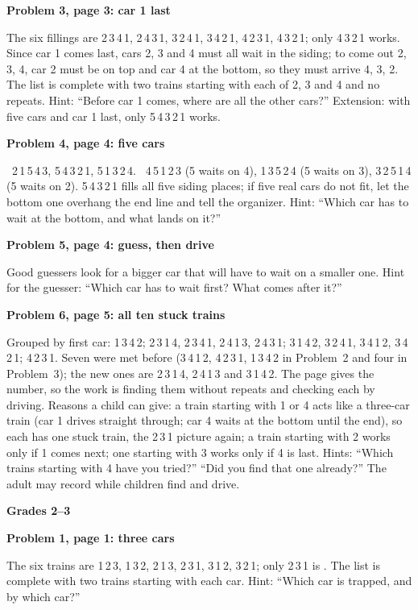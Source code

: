 \documentclass[11pt]{article}
\newcommand{\head}[1]{\par\needspace{5\baselineskip}\textbf{\large #1}\par\nopagebreak}
\newcommand{\sub}[1]{\par\needspace{3\baselineskip}\textbf{#1}\par\nopagebreak}
\newcommand{\yes}{\ding{51}}\newcommand{\no}{\ding{55}}
\newcommand{\tr}[1]{\mbox{#1}}
\begin{document}
\sub{Problem 3, page 3: car 1 last}
The six fillings are \tr{2\,3\,4\,1}, \tr{2\,4\,3\,1}, \tr{3\,2\,4\,1}, \tr{3\,4\,2\,1}, \tr{4\,2\,3\,1}, \tr{4\,3\,2\,1}; only \tr{4\,3\,2\,1} works. Since car 1 comes last, cars 2, 3 and 4 must all wait in the siding; to come out 2, 3, 4, car 2 must be on top and car 4 at the bottom, so they must arrive 4, 3, 2. The list is complete with two trains starting with each of 2, 3 and 4 and no repeats. Hint: ``Before car 1 comes, where are all the other cars?'' Extension: with five cars and car 1 last, only \tr{5\,4\,3\,2\,1} works.

\sub{Problem 4, page 4: five cars}
\yes~\tr{2\,1\,5\,4\,3}, \tr{5\,4\,3\,2\,1}, \tr{5\,1\,3\,2\,4}. \no~\tr{4\,5\,1\,2\,3} (5 waits on 4), \tr{1\,3\,5\,2\,4} (5 waits on 3), \tr{3\,2\,5\,1\,4} (5 waits on 2). \tr{5\,4\,3\,2\,1} fills all five siding places; if five real cars do not fit, let the bottom one overhang the end line and tell the organizer. Hint: ``Which car has to wait at the bottom, and what lands on it?''

\sub{Problem 5, page 4: guess, then drive}
Good guessers look for a bigger car that will have to wait on a smaller one. Hint for the guesser: ``Which car has to wait first? What comes after it?''

\sub{Problem 6, page 5: all ten stuck trains}
Grouped by first car: \tr{1\,3\,4\,2}; \tr{2\,3\,1\,4}, \tr{2\,3\,4\,1}, \tr{2\,4\,1\,3}, \tr{2\,4\,3\,1}; \tr{3\,1\,4\,2}, \tr{3\,2\,4\,1}, \tr{3\,4\,1\,2}, \tr{3\,4\,2\,1}; \tr{4\,2\,3\,1}. Seven were met before (\tr{3\,4\,1\,2}, \tr{4\,2\,3\,1}, \tr{1\,3\,4\,2} in Problem~2 and four in Problem~3); the new ones are \tr{2\,3\,1\,4}, \tr{2\,4\,1\,3} and \tr{3\,1\,4\,2}. The page gives the number, so the work is finding them without repeats and checking each by driving. Reasons a child can give: a train starting with 1 or 4 acts like a three-car train (car 1 drives straight through; car 4 waits at the bottom until the end), so each has one stuck train, the \tr{2\,3\,1} picture again; a train starting with 2 works only if 1 comes next; one starting with 3 works only if 4 is last. Hints: ``Which trains starting with 4 have you tried?'' ``Did you find that one already?'' The adult may record while children find and drive.

\head{Grades 2--3}
\sub{Problem 1, page 1: three cars}
The six trains are \tr{1\,2\,3}, \tr{1\,3\,2}, \tr{2\,1\,3}, \tr{2\,3\,1}, \tr{3\,1\,2}, \tr{3\,2\,1}; only \tr{2\,3\,1} is \no. The list is complete with two trains starting with each car. Hint: ``Which car is trapped, and by which car?''
\end{document}
